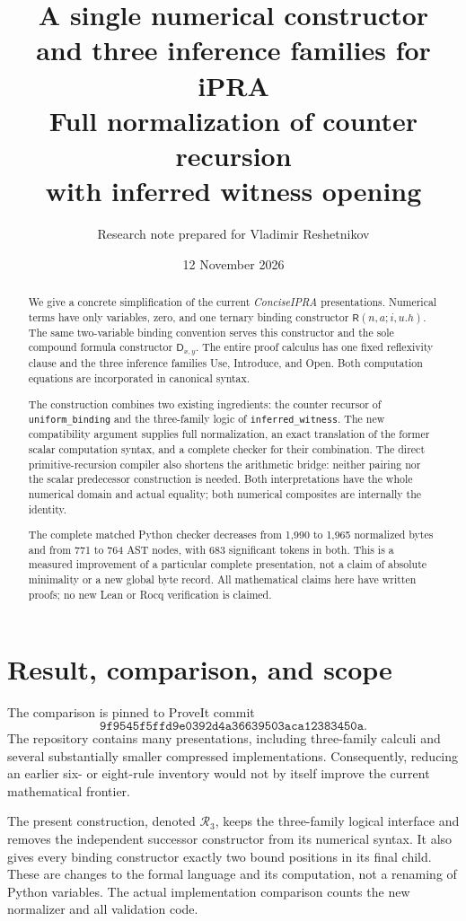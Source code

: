 \documentclass[11pt]{article}
\title{\vspace{-1.3em}\textbf{A single numerical constructor\\
and three inference families for iPRA}\\[0.6em]
\large Full normalization of counter recursion\\
with inferred witness opening}
\author{Research note prepared for Vladimir Reshetnikov}
\date{12 November 2026}
\theoremstyle{definition}
\theoremstyle{remark}
\newcommand{\R}{\mathsf R}
\newcommand{\D}{\mathsf D}
\newcommand{\K}{\mathcal R_3}
\begin{document}
\maketitle
\begin{abstract}
We give a concrete simplification of the current
\emph{ConciseIPRA} presentations. Numerical terms have only variables,
zero, and one ternary binding constructor
$\R(n,a;i,u.h)$. The same two-variable binding convention serves this
constructor and the sole compound formula constructor $\D_{x,y}$.
The entire proof calculus has one fixed reflexivity clause and the
three inference families Use, Introduce, and Open. Both computation
equations are incorporated in canonical syntax.

The construction combines two existing ingredients: the counter
recursor of \texttt{uniform\_binding} and the three-family logic of
\texttt{inferred\_witness}. The new compatibility argument supplies full
normalization, an exact translation of the former scalar computation
syntax, and a complete checker for their combination. The direct
primitive-recursion compiler also shortens the arithmetic bridge:
neither pairing nor the scalar predecessor construction is needed.
Both interpretations have the whole numerical domain and actual
equality; both numerical composites are internally the identity.

The complete matched Python checker decreases from 1,990 to 1,965
normalized bytes and from 771 to 764 AST nodes, with 683 significant
tokens in both. This is a measured improvement of a particular complete
presentation, not a claim of absolute minimality or a new global
byte record. All mathematical claims here have written proofs;
no new Lean or Rocq verification is claimed.
\end{abstract}
\newpage
\tableofcontents
\newpage

\section{Result, comparison, and scope}
\label{sec:result}

The comparison is pinned to ProveIt commit
\[
 \texttt{9f9545f5ffd9e0392d4a36639503aca12383450a}.
\]
The repository contains many presentations, including three-family
calculi and several substantially smaller compressed implementations.
Consequently, reducing an earlier six- or eight-rule inventory would
not by itself improve the current mathematical frontier.

The present construction, denoted $\K$, keeps the three-family logical
interface and removes the independent successor constructor from its
numerical syntax. It also gives every binding constructor exactly two
bound positions in its final child. These are changes to the formal
language and its computation, not a renaming of Python variables.
The actual implementation comparison counts the new normalizer and
all validation code.
\end{document}

